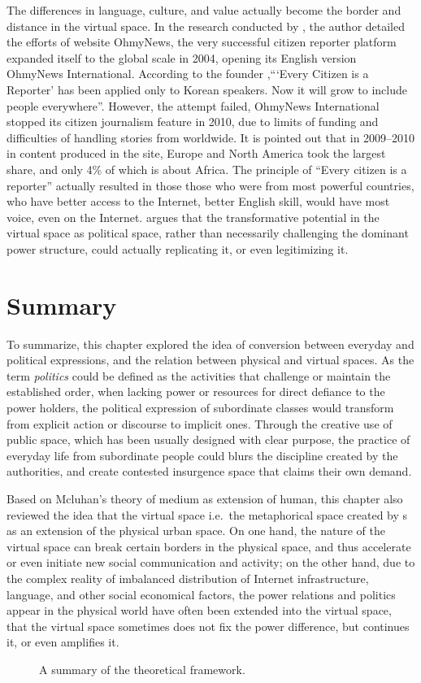 The differences in language, culture, and value actually become the border and distance in the virtual space. In the research conducted by \citet{dencik_alternative_2013}, the author detailed the efforts of website OhmyNews, the very successful citizen reporter platform expanded itself to the global scale in 2004, opening its English version OhmyNews International. According to the founder \citet{oh_end_2004},```Every Citizen is a Reporter' has been applied only to Korean speakers. Now it will grow to include people everywhere''. However, the attempt failed, OhmyNews International stopped its citizen journalism feature in 2010, due to limits of funding and difficulties of handling stories from worldwide. It is pointed out that in 2009--2010 in content produced in the site, Europe and North America took the largest share, and only 4\% of which is about Africa. The principle of ``Every citizen is a reporter'' actually resulted in those those who were from most powerful countries, who have better access to the Internet, better English skill, would have most voice, even on the Internet. \citet{dencik_media_2011} argues that the transformative potential in the virtual space as political space, rather than necessarily challenging the dominant power structure, could actually replicating it, or even legitimizing it.

\section{Summary}

To summarize, this chapter explored the idea of conversion between everyday and political expressions, and the relation between physical and virtual spaces. As the term \textit{politics} could be defined as the activities that challenge or maintain the established order, when lacking power or resources for direct defiance to the power holders, the political expression of subordinate classes would transform from explicit action or discourse to implicit ones. Through the creative use of public space, which has been usually designed with clear purpose, the practice of everyday life from subordinate people could blurs the discipline created by the authorities, and create contested insurgence space that claims their own demand.

Based on Mcluhan's theory of medium as extension of human, this chapter also reviewed the idea that the virtual space i.e.\ the metaphorical space created by \ict s as an extension of the physical urban space. On one hand, the nature of the virtual space can break certain borders in the physical space, and thus accelerate or even initiate new social communication and activity; on the other hand, due to the complex reality of imbalanced distribution of Internet infrastructure, language, and other social economical factors, the power relations and politics appear in the physical world have often been extended into the virtual space, that the virtual space sometimes does not fix the power difference, but continues it, or even amplifies it.

\begin{figure}[!htbp]
	\centering
	
	\caption[A summary of the theoretical framework]{A summary of the theoretical framework.}
	\label{fig:theo}
\end{figure}
